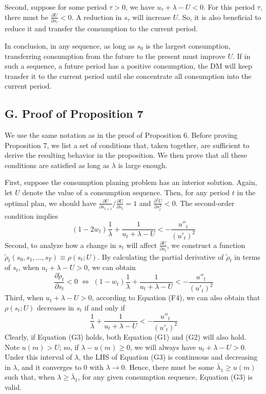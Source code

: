 \documentclass[
  12pt,
]{article}
\begin{document}
Second, suppose for some period \(\tau>0\), we have
\(u_\tau+\lambda-U< 0\). For this period \(\tau\), there must be
\(\frac{\partial U}{\partial s_\tau}<0\). A reduction in \(s_\tau\) will
increase \(U\). So, it is also beneficial to reduce it and transfer the
consumption to the current period.

In conclusion, in any sequence, as long as \(s_0\) is the largest
consumption, transferring consumption from the future to the present
must improve \(U\). If in such a sequence, a future period has a
positive consumption, the DM will keep transfer it to the current period
until she concentrate all consumption into the current period.

\hypertarget{g.-proof-of-proposition-7}{%
\subsection*{G. Proof of Proposition
7}\label{g.-proof-of-proposition-7}}

We use the same notation as in the proof of Proposition 6. Before
proving Proposition 7, we list a set of conditions that, taken together,
are sufficient to derive the resulting behavior in the proposition. We
then prove that all these conditions are satisfied as long as
\(\lambda\) is large enough.

First, suppose the consumption planing problem has an interior solution.
Again, let \(U\) denote the value of a consumption sequence. Then, for
any period \(t\) in the optimal plan, we should have
\(\frac{\partial U}{\partial s_{t+1}}/\frac{\partial U}{\partial s_{t}}=1\)
and \(\frac{\partial^2 U}{\partial s_t^2}<0\). The second-order
condition
implies\[\tag{G1} (1-2w_t)\frac{1}{\lambda} + \frac{1}{u_t+\lambda-U} < -\frac{u''_t}{(u'_t)^2}  \]Second,
to analyze how a change in \(s_t\) will affect
\(\frac{\partial U}{\partial s_t}\), we construct a function
\(\tilde{\rho}_t(s_0,s_1,...,s_T)\equiv\rho(s_t;U)\). By calculating the
partial derivative of \(\tilde{\rho}_t\) in terms of \(s_t\), when
\(u_t+\lambda-U>0\), we can
obtain\[\tag{G2} \frac{\partial \tilde{\rho}_t}{\partial s_t} <0 \;\Longleftrightarrow\; (1-w_t)\frac{1}{\lambda}+\frac{1}{u_t+\lambda-U}<-\frac{u''_t}{(u'_t)^2} \]Third,
when \(u_t+\lambda-U>0\), according to Equation (F4), we can also obtain
that \(\rho(s_t;U)\) decreases in \(s_t\) if and only
if\[\tag{G3} \frac{1}{\lambda}+\frac{1}{u_t+\lambda-U}<-\frac{u''_t}{(u'_t)^2} \]Clearly,
if Equation (G3) holds, both Equation (G1) and (G2) will also hold. Note
\(u(m)>U\); so, if \(\lambda - u(m)\geq 0\), we will always have
\(u_t+\lambda-U>0\). Under this interval of \(\lambda\), the LHS of
Equation (G3) is continuous and decreasing in \(\lambda\), and it
converges to 0 with \(\lambda \rightarrow 0\). Hence, there must be some
\(\bar{\lambda}_1 \geq u(m)\) such that, when
\(\lambda\geq \bar{\lambda}_1\), for any given consumption sequence,
Equation (G3) is valid.
\end{document}
